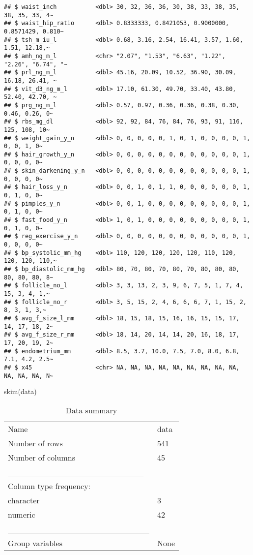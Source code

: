 \documentclass[
]{article}
\newenvironment{Shaded}{\begin{snugshade}}{\end{snugshade}}
\newcommand{\FunctionTok}[1]{\textcolor[rgb]{0.00,0.00,0.00}{#1}}
\newcommand{\NormalTok}[1]{#1}
\begin{document}
\begin{verbatim}
## $ waist_inch           <dbl> 30, 32, 36, 36, 30, 38, 33, 38, 35, 38, 35, 33, 4~
## $ waist_hip_ratio      <dbl> 0.8333333, 0.8421053, 0.9000000, 0.8571429, 0.810~
## $ tsh_m_iu_l           <dbl> 0.68, 3.16, 2.54, 16.41, 3.57, 1.60, 1.51, 12.18,~
## $ amh_ng_m_l           <chr> "2.07", "1.53", "6.63", "1.22", "2.26", "6.74", "~
## $ prl_ng_m_l           <dbl> 45.16, 20.09, 10.52, 36.90, 30.09, 16.18, 26.41, ~
## $ vit_d3_ng_m_l        <dbl> 17.10, 61.30, 49.70, 33.40, 43.80, 52.40, 42.70, ~
## $ prg_ng_m_l           <dbl> 0.57, 0.97, 0.36, 0.36, 0.38, 0.30, 0.46, 0.26, 0~
## $ rbs_mg_dl            <dbl> 92, 92, 84, 76, 84, 76, 93, 91, 116, 125, 108, 10~
## $ weight_gain_y_n      <dbl> 0, 0, 0, 0, 0, 1, 0, 1, 0, 0, 0, 0, 1, 0, 0, 1, 0~
## $ hair_growth_y_n      <dbl> 0, 0, 0, 0, 0, 0, 0, 0, 0, 0, 0, 0, 1, 0, 0, 0, 0~
## $ skin_darkening_y_n   <dbl> 0, 0, 0, 0, 0, 0, 0, 0, 0, 0, 0, 0, 1, 0, 0, 0, 0~
## $ hair_loss_y_n        <dbl> 0, 0, 1, 0, 1, 1, 0, 0, 0, 0, 0, 0, 1, 0, 1, 0, 0~
## $ pimples_y_n          <dbl> 0, 0, 1, 0, 0, 0, 0, 0, 0, 0, 0, 0, 1, 0, 1, 0, 0~
## $ fast_food_y_n        <dbl> 1, 0, 1, 0, 0, 0, 0, 0, 0, 0, 0, 0, 1, 0, 1, 0, 0~
## $ reg_exercise_y_n     <dbl> 0, 0, 0, 0, 0, 0, 0, 0, 0, 0, 0, 0, 1, 0, 0, 0, 0~
## $ bp_systolic_mm_hg    <dbl> 110, 120, 120, 120, 120, 110, 120, 120, 120, 110,~
## $ bp_diastolic_mm_hg   <dbl> 80, 70, 80, 70, 80, 70, 80, 80, 80, 80, 80, 80, 8~
## $ follicle_no_l        <dbl> 3, 3, 13, 2, 3, 9, 6, 7, 5, 1, 7, 4, 15, 3, 4, 1,~
## $ follicle_no_r        <dbl> 3, 5, 15, 2, 4, 6, 6, 6, 7, 1, 15, 2, 8, 3, 1, 3,~
## $ avg_f_size_l_mm      <dbl> 18, 15, 18, 15, 16, 16, 15, 15, 17, 14, 17, 18, 2~
## $ avg_f_size_r_mm      <dbl> 18, 14, 20, 14, 14, 20, 16, 18, 17, 17, 20, 19, 2~
## $ endometrium_mm       <dbl> 8.5, 3.7, 10.0, 7.5, 7.0, 8.0, 6.8, 7.1, 4.2, 2.5~
## $ x45                  <chr> NA, NA, NA, NA, NA, NA, NA, NA, NA, NA, NA, NA, N~
\end{verbatim}

\begin{Shaded}
\begin{Highlighting}[]
\FunctionTok{skim}\NormalTok{(data)}
\end{Highlighting}
\end{Shaded}

\begin{longtable}[]{@{}ll@{}}
\caption{Data summary}\tabularnewline
\toprule()
\endhead
Name & data \\
Number of rows & 541 \\
Number of columns & 45 \\
\_\_\_\_\_\_\_\_\_\_\_\_\_\_\_\_\_\_\_\_\_\_\_ & \\
Column type frequency: & \\
character & 3 \\
numeric & 42 \\
\_\_\_\_\_\_\_\_\_\_\_\_\_\_\_\_\_\_\_\_\_\_\_\_ & \\
Group variables & None \\
\bottomrule()
\end{longtable}
\end{document}
